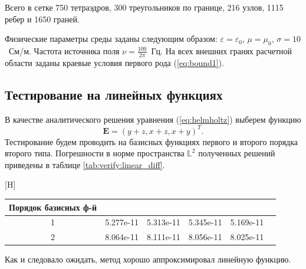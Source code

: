 \documentclass[a4paper,14pt]{article}
\makeatletter
\renewenvironment{table}[1][\fps@table]{
  \edef\@tempa{\noexpand\@float{table}[#1]}
  \@tempa
  \addtocounter{footable}{1}
}{
  \end@float
}
\makeatother
\begin{document}
\noindent Всего в сетке 750 тетраэдров, 300 треугольников по границе, 216 узлов, 1115 ребер и 1650 граней.

Физические параметры среды заданы следующим образом: $\varepsilon = \varepsilon_0$, $\mu = \mu_0$, $\sigma = 10$~См/м. Частота источника поля $\nu = \frac{100}{2 \pi}$~Гц. На всех внешних гранях расчетной области заданы краевые условия первого рода (\ref{eq:bound1}).


\subsection{Тестирование на линейных функциях}
В качестве аналитического решения уравнения (\ref{eq:helmholtz}) выберем функцию
\begin{equation*}
	\mathbf{E} = ( y+z , x+z, x+y )^T .
\end{equation*}
Тестирование будем проводить на базисных функциях первого и второго порядка второго типа. Погрешности в норме пространства $\mathbb{L}^2$ полученных решений приведены в таблице \ref{tab:verify:linear_diff}.

\begin{table}[H]
	\caption{относительные погрешности в норме $\mathbb{L}^2$}
	\label{tab:verify:linear_diff}
	\begin{tabularx}{\textwidth}{|C{1}|C{1}|C{1}|C{1}|C{1}|C{1}|}
		\hline Порядок базисных ф-й &  &  &  &  \\
		 & 5.277e-11 & 5.313e-11 & 5.345e-11 & 5.169e-11 \\
		 & 8.064e-11 & 8.111e-11 & 8.056e-11 & 8.025e-11 \\
		\hline
	\end{tabularx}
\end{table}
\vspace{-0.5cm}Как и следовало ожидать, метод хорошо аппроксимировал линейную функцию.
\end{document}
